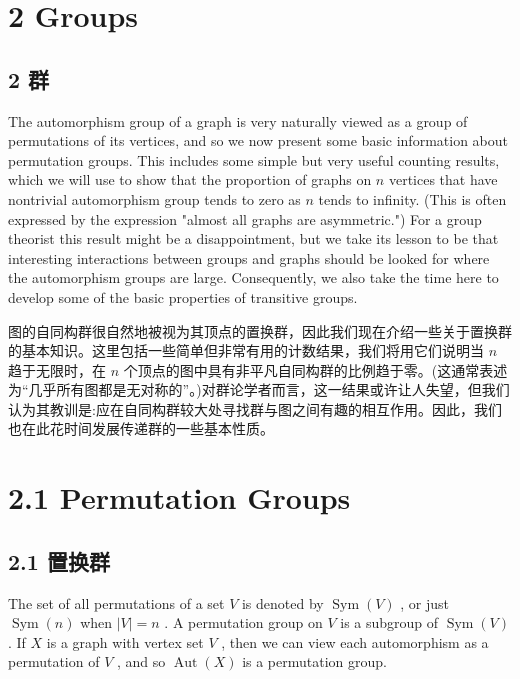 \documentclass[10pt]{article}
\begin{document}
\section*{2 Groups}

\begin{tcolorbox}\relax
\section*{2 群}
\end{tcolorbox}

The automorphism group of a graph is very naturally viewed as a group of permutations of its vertices, and so we now present some basic information about permutation groups. This includes some simple but very useful counting results, which we will use to show that the proportion of graphs on \(n\) vertices that have nontrivial automorphism group tends to zero as \(n\) tends to infinity. (This is often expressed by the expression "almost all graphs are asymmetric.") For a group theorist this result might be a disappointment, but we take its lesson to be that interesting interactions between groups and graphs should be looked for where the automorphism groups are large. Consequently, we also take the time here to develop some of the basic properties of transitive groups.

\begin{tcolorbox}\relax
图的自同构群很自然地被视为其顶点的置换群，因此我们现在介绍一些关于置换群的基本知识。这里包括一些简单但非常有用的计数结果，我们将用它们说明当 \(n\) 趋于无限时，在 \(n\) 个顶点的图中具有非平凡自同构群的比例趋于零。(这通常表述为“几乎所有图都是无对称的”。)对群论学者而言，这一结果或许让人失望，但我们认为其教训是:应在自同构群较大处寻找群与图之间有趣的相互作用。因此，我们也在此花时间发展传递群的一些基本性质。
\end{tcolorbox}

\section*{2.1 Permutation Groups}

\begin{tcolorbox}\relax
\section*{2.1 置换群}
\end{tcolorbox}

The set of all permutations of a set \(V\) is denoted by \(\operatorname{Sym}\left( V\right)\) , or just \(\operatorname{Sym}\left( n\right)\) when \(\left| V\right|  = n\) . A permutation group on \(V\) is a subgroup of \(\operatorname{Sym}\left( V\right)\) . If \(X\) is a graph with vertex set \(V\) , then we can view each automorphism as a permutation of \(V\) , and so \(\operatorname{Aut}\left( X\right)\) is a permutation group.
\end{document}
